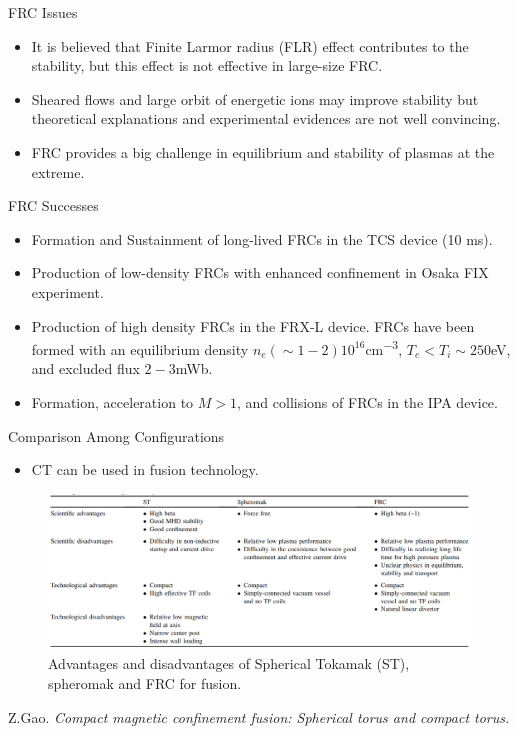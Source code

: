 \begin{frame} {FRC Issues \cite{gao_2016_compact}}
    \begin{itemize}
        \item It is believed that Finite Larmor radius (FLR) effect contributes to the stability, but this effect is not effective in large-size FRC.
        \item Sheared flows and large orbit of energetic ions may improve stability but theoretical explanations and experimental evidences are not well convincing.
        \item FRC provides a big challenge in equilibrium and stability of plasmas at the extreme.
    \end{itemize}
\end{frame}

\begin{frame} {FRC Successes \cite{woodruff_2008_technical}}
    \begin{itemize}
        \item Formation and Sustainment of long-lived FRCs in the TCS device (10 ms).
        \item Production of low-density FRCs with enhanced confinement in Osaka FIX experiment.
        \item Production of high density FRCs in the FRX-L device. FRCs have been formed with an equilibrium density $n_e (\sim 1-2) 10^{16}$\unit{\cm^{-3}}, $T_e < T_i \sim 250$\unit{eV}, and excluded flux $2-3$\unit{\milli\weber}.
        \item Formation, acceleration to $M > 1$, and collisions of FRCs in the IPA device.
    \end{itemize}
\end{frame}

\begin{frame} {Comparison Among Configurations}
    \begin{itemize}
        \item CT can be used in fusion technology.
    \end{itemize}
    \begin{figure}
        \centering
        \includegraphics[width=\textwidth]{figures/comparisons.png}
        \caption{Advantages and disadvantages of Spherical Tokamak (ST), spheromak and FRC for fusion. \cite{gao_2016_compact}}
        \label{fig:comparisons}
    \end{figure}

    \tiny \cite{gao_2016_compact} Z.Gao. \textit{Compact magnetic confinement fusion: Spherical torus and compact torus.}
\end{frame}


